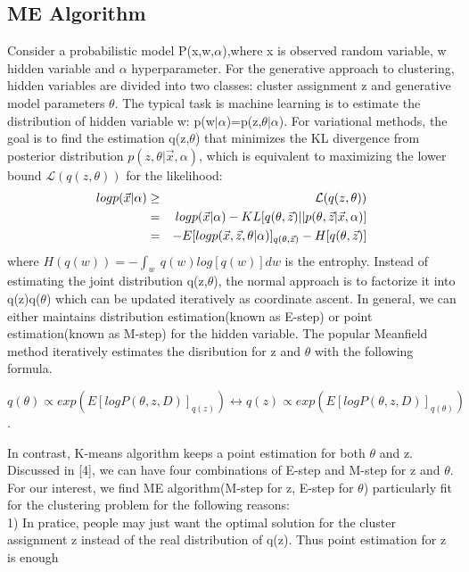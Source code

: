 \documentclass{article}
\begin{document}
\subsection{ME Algorithm}
Consider a probabilistic model P(x,w,$\alpha$),where x is observed random variable, w hidden variable and $\alpha$ hyperparameter.   
For the generative approach to clustering, hidden variables are divided into two classes: cluster assignment z and generative model parameters $\theta$.  
The typical task is machine learning is to estimate the distribution of hidden variable w: p(w$|\alpha$)=p(z,$\theta|\alpha$).
For variational methods, the goal is to find the estimation q(z,$\theta$) that minimizes the KL divergence from posterior distribution $p(z,\theta |\vec x,\alpha)$, which 
is equivalent to maximizing the lower bound $\mathcal{L}(q(z,\theta))$ for the likelihood:
\begin{eqnarray*}
log p(\vec x |\alpha)
&\geq&\mathcal{L}(q(z,\theta)) \\
&=&log p(\vec x | \alpha)-KL[q(\theta,\vec z) || p(\theta,\vec z | \vec x,\alpha)] \\
&=&-\boldmath{E}[log p(\vec x,\vec z, \theta | \alpha)]_{q(\theta,\vec z)}-H[q(\theta,\vec z)] 
\end{eqnarray*}
where $H(q(w))=-\int_w \ q(w)log [q(w)] dw$ is the entrophy.
Instead of estimating the joint distribution q(z,$\theta$), the normal approach is to factorize it into q(z)q($\theta$) which can be updated iteratively as coordinate ascent. 
In general, we can either maintains distribution estimation(known as E-step) or point estimation(known as M-step) for the hidden variable.
The popular Meanfield method iteratively estimates the disribution for z and $\theta$ with the following formula.
\begin{center}
$q (\theta ) \propto exp(E[log P(\theta, z, D)]_{q(z)} ) \longleftrightarrow q (z) \propto  exp(E[log P(\theta, z, D)]_{q (\theta )})$.
\end{center}
In contrast, K-means algorithm keeps a point estimation for both $\theta$ and z. 
Discussed in [4], we can have four combinations of E-step and M-step for z and $\theta$. 
For our interest, we find ME algorithm(M-step for z, E-step for $\theta$) particularly fit for the clustering problem for the following reasons:\\

1) In pratice, people may just want the optimal solution for the cluster assignment z instead of the real distribution of q(z).
Thus point estimation for z is enough\\
\end{document}
